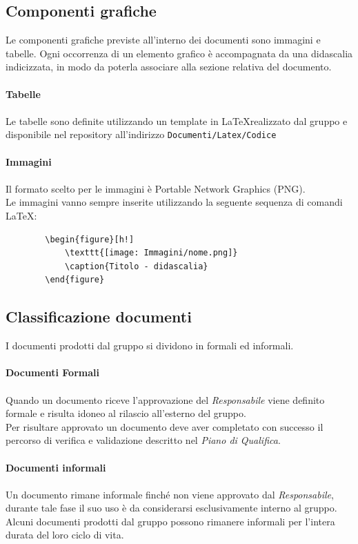 \documentclass[a4paper]{report}
\begin{document}
	\subsection{Componenti grafiche}
	Le componenti grafiche previste all'interno dei documenti sono immagini e tabelle. Ogni occorrenza di un
	elemento grafico è accompagnata da una didascalia indicizzata, in modo da poterla associare alla sezione 
	relativa del documento. \\ \\
	\textbf{Tabelle} \\ \\ 
	Le tabelle sono definite utilizzando un template in \LaTeX \space realizzato dal gruppo e disponibile nel 
	repository all'indirizzo \verb|Documenti/Latex/Codice| \\ \\ 
	\textbf{Immagini}  \\ \\
	Il formato scelto per le immagini è Portable Network Graphics (PNG). \\
	Le immagini vanno sempre inserite utilizzando la seguente sequenza di comandi \LaTeX:
	\begin{verbatim}
		\begin{figure}[h!]
			\texttt{[image: Immagini/nome.png]}
			\caption{Titolo - didascalia}
		\end{figure}
	\end{verbatim}
	\subsection{Classificazione documenti}
	I documenti prodotti dal gruppo si dividono in formali ed informali. \\ \\
	\textbf{Documenti Formali} \\ \\
	Quando un documento riceve l'approvazione del \emph{Responsabile} viene definito formale e risulta idoneo
	al rilascio all'esterno del gruppo. \\
	Per risultare approvato un documento deve aver completato con successo il percorso di verifica e validazione 
	descritto nel \emph{Piano di Qualifica}. \\ \\
	\textbf{Documenti informali} \\ \\
	Un documento rimane informale finché non viene approvato dal \emph{Responsabile}, durante tale fase 
	il suo uso è da considerarsi esclusivamente interno al gruppo. \\
	Alcuni documenti prodotti dal gruppo possono rimanere informali per l'intera durata del loro ciclo di vita.
\end{document}
